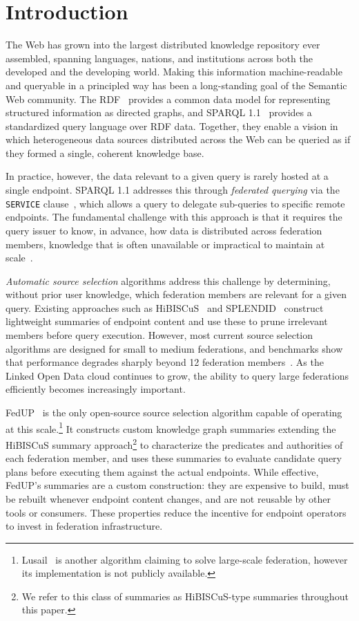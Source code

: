 \section{Introduction}

The Web has grown into the largest distributed knowledge repository ever assembled,
spanning languages, nations, and institutions across both the developed and the developing world.
Making this information machine-readable and queryable in a principled way has been a long-standing goal of the Semantic Web community.
The  \ac{RDF}~\cite{w3ConceptsAbstract} provides a common data model for representing structured information as directed graphs,
and SPARQL 1.1~\cite{w3SPARQLQuery} provides a standardized query language over RDF data.
Together, they enable a vision in which heterogeneous data sources distributed across the Web
can be queried as if they formed a single, coherent knowledge base.

In practice, however, the data relevant to a given query is rarely hosted at a single endpoint.
SPARQL 1.1 addresses this through \emph{federated querying} via the \texttt{SERVICE} clause~\cite{w3SPARQLFederated},
which allows a query to delegate sub-queries to specific remote endpoints.
The fundamental challenge with this approach is that it requires the query issuer to know, in advance,
how data is distributed across federation members, knowledge that is often unavailable or impractical to maintain at scale~\cite{hanski2025observations}.

\emph{Automatic source selection} algorithms address this challenge by determining, without prior user knowledge,
which federation members are relevant for a given query.
Existing approaches such as HiBISCuS~\cite{saleem2014hibiscus} and SPLENDID~\cite{gorlitz2011splendid} construct
lightweight summaries of endpoint content and use these to prune irrelevant members before query execution.
However, most current source selection algorithms are designed for small to medium federations,
and benchmarks show that performance degrades sharply beyond 12 federation members~\cite{aimonierdavat:hal-04538238}.
As the Linked Open Data cloud continues to grow, the ability to query large federations efficiently becomes increasingly important.

FedUP~\cite{aimonierdavat:hal-04538238} is the only open-source source selection algorithm capable of operating at this scale.\footnote{Lusail~\cite{lusail2017} is another algorithm claiming to solve large-scale federation, however its implementation is not publicly available.}
It constructs custom knowledge graph summaries extending the HiBISCuS summary approach\footnote{We refer to this class of summaries as HiBISCuS-type summaries throughout this paper.} to characterize the predicates and authorities of each federation member,
and uses these summaries to evaluate candidate query plans before executing them against the actual endpoints.
While effective, FedUP's summaries are a custom construction: they are expensive to build, must be rebuilt whenever endpoint content changes,
and are not reusable by other tools or consumers.
These properties reduce the incentive for endpoint operators to invest in federation infrastructure.

